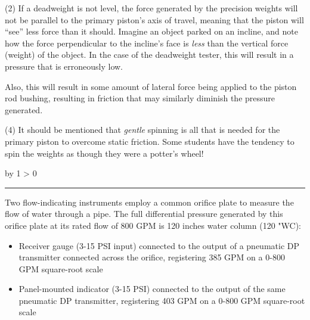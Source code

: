 \documentclass[12pt,a4paper]{article}
\def\oppgave{
            \advance\questnum by 1
            \ifnum \questnum > 0
                 \hrule
                 \vskip 3pt
                 \leftline{Oppgave \the\questnum}
                 \vskip 3pt \fi}
\begin{document}
\vskip 10pt {\narrower \noindent \baselineskip5pt

\noindent
(2) If a deadweight is not level, the force generated by the precision weights will not be parallel to the primary piston's axis of travel, meaning that the piston will ``see'' less force than it should.  Imagine an object parked on an incline, and note how the force perpendicular to the incline's face is {\it less} than the vertical force (weight) of the object.  In the case of the deadweight tester, this will result in a pressure that is erroneously low.

\vskip 10pt

\noindent
Also, this will result in some amount of lateral force being applied to the piston rod bushing, resulting in friction that may similarly diminish the pressure generated.

\par} \vskip 10pt






\vskip 10pt {\narrower \noindent \baselineskip5pt

\noindent
(4) It should be mentioned that {\it gentle} spinning is all that is needed for the primary piston to overcome static friction.  Some students have the tendency to spin the weights as though they were a potter's wheel!

\par} \vskip 10pt


\vfil \eject 



\oppgave{} 

Two flow-indicating instruments employ a common orifice plate to measure the flow of water through a pipe.  The full differential pressure generated by this orifice plate at its rated flow of 800 GPM is 120 inches water column (120 "WC):

\vskip 10pt

\begin{itemize}
\item{} Receiver gauge (3-15 PSI input) connected to the output of a pneumatic DP transmitter connected across the orifice, registering 385 GPM on a 0-800 GPM square-root scale
\vskip 10pt
\item{} Panel-mounted indicator (3-15 PSI) connected to the output of the same pneumatic DP transmitter, registering 403 GPM on a 0-800 GPM square-root scale
\end{itemize}
\end{document}
